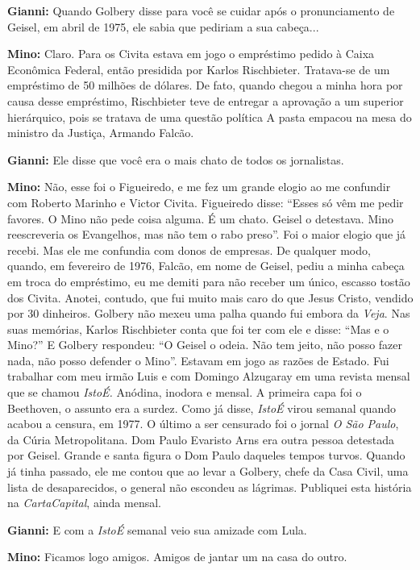 \textbf{Gianni:} Quando Golbery disse para você se cuidar após o
pronunciamento de Geisel, em abril de 1975, ele sabia que pediriam a sua
cabeça...

\textbf{Mino:} Claro. Para os Civita estava em jogo o empréstimo pedido
à Caixa Econômica Federal, então presidida por Karlos Rischbieter.
Tratava-se de um empréstimo de 50 milhões de dólares. De fato, quando
chegou a minha hora por causa desse empréstimo, Rischbieter teve de
entregar a aprovação a um superior hierárquico, pois se tratava de uma
questão política A pasta empacou na mesa do ministro da Justiça, Armando
Falcão.

\textbf{Gianni:} Ele disse que você era o mais chato de todos os
jornalistas.

\textbf{Mino:} Não, esse foi o Figueiredo, e me fez um grande elogio ao
me confundir com Roberto Marinho e Victor Civita. Figueiredo disse:
``Esses só vêm me pedir favores. O Mino não pede coisa alguma. É um
chato. Geisel o detestava. Mino reescreveria os Evangelhos, mas não tem
o rabo preso''. Foi o maior elogio que já recebi. Mas ele me confundia
com donos de empresas. De qualquer modo, quando, em fevereiro de 1976,
Falcão, em nome de Geisel, pediu a minha cabeça em troca do empréstimo,
eu me demiti para não receber um único, escasso tostão dos Civita.
Anotei, contudo, que fui muito mais caro do que Jesus Cristo, vendido
por 30 dinheiros. Golbery não mexeu uma palha quando fui embora da
\emph{Veja}. Nas suas memórias, Karlos Rischbieter conta que foi ter com
ele e disse: ``Mas e o Mino?'' E Golbery respondeu: ``O Geisel o odeia.
Não tem jeito, não posso fazer nada, não posso defender o Mino''.
Estavam em jogo as razões de Estado. Fui trabalhar com meu irmão Luis e
com Domingo Alzugaray em uma revista mensal que se chamou \emph{IstoÉ.}
Anódina, inodora e mensal. A primeira capa foi o Beethoven, o assunto
era a surdez. Como já disse, \emph{IstoÉ} virou semanal quando acabou a
censura, em 1977. O último a ser censurado foi o jornal \emph{O São
Paulo}, da Cúria Metropolitana. Dom Paulo Evaristo Arns era outra pessoa
detestada por Geisel. Grande e santa figura o Dom Paulo daqueles tempos
turvos. Quando já tinha passado, ele me contou que ao levar a Golbery,
chefe da Casa Civil, uma lista de desaparecidos, o general não escondeu
as lágrimas. Publiquei esta história na \emph{CartaCapital}, ainda
mensal.

\textbf{Gianni:} E com a \emph{IstoÉ} semanal veio sua amizade com Lula.

\textbf{Mino:} Ficamos logo amigos. Amigos de jantar um na casa do
outro.

